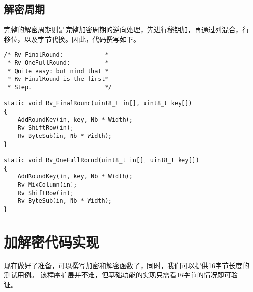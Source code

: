 \documentclass[UTF8]{ctexart}
\begin{document}
\subsection{解密周期}
完整的解密周期则是完整加密周期的逆向处理，先进行秘钥加，再通过列混合，行移位，以及字节代换。因此，代码撰写如下。
\begin{lstlisting}
/* Rv_FinalRound:            *
 * Rv_OneFullRound:          *
 * Quite easy: but mind that *
 * Rv_FinalRound is the first*
 * Step.                     */

static void Rv_FinalRound(uint8_t in[], uint8_t key[])
{
	AddRoundKey(in, key, Nb * Width);
	Rv_ShiftRow(in);
	Rv_ByteSub(in, Nb * Width);
}

static void Rv_OneFullRound(uint8_t in[], uint8_t key[])
{
	AddRoundKey(in, key, Nb * Width);
	Rv_MixColumn(in);
	Rv_ShiftRow(in);
	Rv_ByteSub(in, Nb * Width);
}
\end{lstlisting}
\section{加解密代码实现}
现在做好了准备，可以撰写加密和解密函数了，同时，我们可以提供16字节长度的测试用例。
该程序扩展并不难，但基础功能的实现只需看16字节的情况即可验证。
\end{document}
